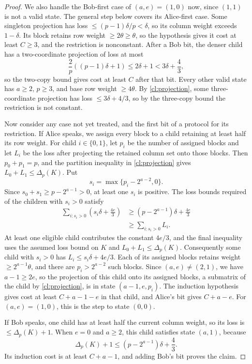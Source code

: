 \documentclass[11pt,letterpaper]{article} \usepackage[utf8]{inputenc}
\theoremstyle{plain} \newtheorem{theorem}{Theorem}[section]
\theoremstyle{definition} \newaliascnt{definition}{theorem}
\begin{document}
\begin{proof}
We also handle the Bob-first case of \((a,e)=(1,0)\) now, since \((1,1)\) is not a
valid state. The general step below covers its Alice-first case.
Some singleton projection has loss
\(\le(p-1)\delta/p<\delta\), so its column weight exceeds \(1-\delta\).
Its block retains row weight \(\ge2\theta\ge\theta\), so the hypothesis gives it
cost at least \(C\ge3\), and the restriction is nonconstant. After a Bob bit,
the denser child has a two-coordinate projection of loss at most
\[
\frac2p\left((p-1)\delta+1\right) \le2\delta+1<3\delta+\frac43,
\]
so the two-copy bound gives cost at least \(C\) after that bit. Every other
valid state has \(a\ge2\), \(p\ge3\), and base row weight \(\ge4\theta\). By \cref{cl:projection}, some
three-coordinate projection has loss \(\le3\delta+4/3\), so by the
three-copy bound the restriction is not constant.

Now consider any case not yet treated, and the first bit of a protocol for its restriction. If Alice
speaks, we assign every block to a child retaining at least half its row weight. For
child \(i\in\{0,1\}\), let \(p_i\) be the number of assigned blocks and let
\(L_i\) be the loss after projecting the retained column set onto those
blocks. Then \(p_0+p_1=p\), and the partition inequality in \cref{cl:projection}
gives \(L_0+L_1\le\Delta_p(K)\). Put
\[
s_i=\max\{p_i-2^{a-2},0\}.
\]
Since \(s_0+s_1\ge p-2^{a-1}>0\), at least one \(s_i\) is positive. The
loss bounds required of the children with \(s_i>0\) satisfy
\[
 \begin{aligned}
\sum_{i:s_i>0}\left(s_i\delta+\frac{4e}{3}\right)
 &\ge (p-2^{a-1})\delta+\frac{4e}{3}\\
&\ge\sum_{i:s_i>0}L_i.
 \end{aligned}
\]
At least one eligible child contributes the constant \(4e/3\), and the
final inequality uses the assumed loss bound on \(K\) and
\(L_0+L_1\le\Delta_p(K)\). Consequently some child with \(s_i>0\) has
\(L_i\le s_i\delta+4e/3\). Each of its assigned blocks retains weight \(\ge2^{a-1}\theta\), and
there are \(p_i>2^{a-2}\) such blocks. Since \((a,e)\ne(2,1)\), we have \(a-1\ge2e\), so the
projection of this child onto its assigned blocks, a submatrix of the child by \cref{cl:projection},
is in state \((a-1,e,p_i)\). The induction hypothesis gives cost at least
\(C+a-1-e\) in that child, and Alice's bit gives \(C+a-e\). For \((a,e)=(1,0)\),
this is the step to state \((0,0)\).

If Bob speaks, one child has at least half the current column weight, so its loss
is \(\le\Delta_p(K)+1\). When \(e=0\) and \(a\ge2\), this child satisfies
state \((a,1)\), because
\[
\Delta_p(K)+1\le(p-2^{a-1})\delta+\frac43.
\]
Its induction cost is at least \(C+a-1\), and adding Bob's bit proves the claim.


\end{proof}
\end{document}
